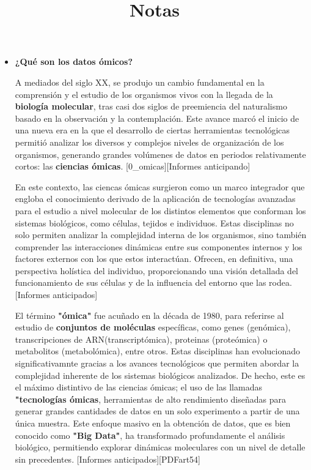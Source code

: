 \documentclass{article}
\begin{document}
\title{Notas}

\begin{itemize}
    \item \textbf{¿Qué son los datos ómicos?}
    

    A mediados del siglo XX, se produjo un cambio fundamental en la comprensión y el estudio de los organismos vivos
    con la llegada de la \textbf{biología molecular}, tras casi dos siglos de preemiencia del naturalismo basado en
    la observación y la contemplación. Este avance marcó el inicio de una nueva era en la que el desarrollo de 
    ciertas herramientas tecnológicas permitió analizar los diversos y complejos niveles de organización de los
    organismos, generando grandes volúmenes de datos en periodos relativamente cortos: las \textbf{ciencias ómicas}. [0_omicas][Informes anticipando]

    En este contexto, las ciencas ómicas surgieron como un marco integrador que engloba el conocimiento derivado de 
    la aplicación de tecnologías avanzadas para el estudio a nivel molecular de los distintos elementos que conforman los
    sistemas biológicos, como células, tejidos e individuos. Estas disciplinas no solo permiten analizar la complejidad interna
    de los organismos, sino también comprender las interacciones dinámicas entre sus componentes internos y los factores
    externos con los que estos interactúan. Ofrecen, en definitiva, una perspectiva holística del individuo, proporcionando una visión 
    detallada del funcionamiento de sus células y de la influencia del entorno que las rodea. [Informes anticipados]

    El término \textbf{"ómica"} fue acuñado en la década de 1980, para referirse al estudio de \textbf{conjuntos de moléculas}
    específicas, como genes (genómica), transcripciones de ARN(transcriptómica), proteinas (proteómica) o metabolitos
    (metabolómica), entre otros. Estas disciplinas han evolucionado significativamnte gracias a los avances tecnológicos
    que permiten abordar la complejidad inherente de los sistemas biológicos analizados. De hecho, este es el máximo
    distintivo de las ciencias ómicas; el uso de las llamadas \textbf{"tecnologías ómicas}, herramientas de alto rendimiento
    diseñadas para generar grandes cantidades de datos en un solo experimento a partir de una única muestra. Este enfoque masivo
    en la obtención de datos, que es bien conocido como \textbf{"Big Data"}, ha transformado profundamente el análisis biológico,
    permitiendo explorar dinámicas moleculares con un nivel de detalle sin precedentes. [Informes anticipados][PDFart54]


\end{itemize}
\end{document}
